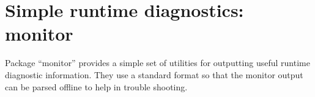 

\chapter{Simple runtime diagnostics: monitor}
  
Package ``monitor'' provides a simple set of utilities for outputting
useful runtime diagnostic information. They use a standard format so
that the monitor output can be parsed offline to help in trouble
shooting.

